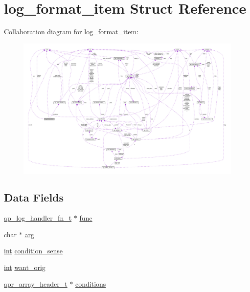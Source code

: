 \hypertarget{structlog__format__item}{}\section{log\+\_\+format\+\_\+item Struct Reference}
\label{structlog__format__item}


Collaboration diagram for log\+\_\+format\+\_\+item\+:
\nopagebreak
\begin{figure}[H]
\begin{center}
\leavevmode
\includegraphics[width=350pt]{structlog__format__item__coll__graph}
\end{center}
\end{figure}
\subsection*{Data Fields}
\begin{DoxyCompactItemize}
\item 
\hyperlink{group__MOD__LOG__CONFIG_ga8b3bfba0c0ad4bfc84f9c730478a38ed}{ap\+\_\+log\+\_\+handler\+\_\+fn\+\_\+t} $\ast$ \hyperlink{structlog__format__item_ac96361d1801469fe23f51e208b72dac1}{func}
\item 
char $\ast$ \hyperlink{structlog__format__item_a02fb5f9679605b6987f0d128675a77a6}{arg}
\item 
\hyperlink{pcre_8txt_a42dfa4ff673c82d8efe7144098fbc198}{int} \hyperlink{structlog__format__item_a6945b946715d96b683db4a92042519f7}{condition\+\_\+sense}
\item 
\hyperlink{pcre_8txt_a42dfa4ff673c82d8efe7144098fbc198}{int} \hyperlink{structlog__format__item_ad47dec8a92bdf2e45b6ee306caf5a34a}{want\+\_\+orig}
\item 
\hyperlink{structapr__array__header__t}{apr\+\_\+array\+\_\+header\+\_\+t} $\ast$ \hyperlink{structlog__format__item_a2bdcbabef8f6c31637930465375831c4}{conditions}
\end{DoxyCompactItemize}


